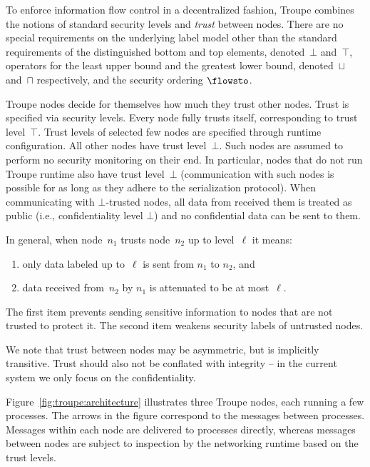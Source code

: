 To  enforce information flow control in a decentralized fashion, Troupe combines the notions of standard security levels and \emph{trust} between nodes.
There are no special requirements on the underlying label model other than the standard requirements of the distinguished bottom and top elements, denoted~$\bot$ and~$\top$, operators for the least upper bound and the greatest lower bound, denoted~$\sqcup$ and~$\sqcap$ respectively, and the security ordering $\flowsto$.

Troupe nodes decide for themselves how much they trust other nodes.
Trust is specified via security levels. Every node fully trusts itself, corresponding to trust level~$\top$. Trust levels of selected few nodes are specified through runtime configuration. All other nodes have trust level~$\bot$. Such nodes are assumed to perform no security monitoring on their end. In particular, nodes that do not run Troupe runtime also have trust level~$\bot$ (communication with such nodes is possible for as long as they adhere to the serialization protocol). When communicating with $\bot$-trusted nodes, all data from received them is treated as public (i.e., confidentiality level $\bot$) and no confidential data can be sent to them. 

In general, when node~$n_1$ trusts node~$n_2$ up to level~$\ell$ it means:
\begin{enumerate}
    \item only data labeled up to~$\ell$ is sent from $n_1$ to $n_2$, and 
    \item data received from~$n_2$ by $n_1$ is attenuated to be at most~$\ell$.
\end{enumerate}

\noindent 
The first item prevents sending sensitive information to nodes that are not trusted to protect it. The second item weakens security labels of untrusted nodes.



 We note that trust between nodes may be asymmetric, but is implicitly transitive. Trust should also not be conflated with integrity -- in the current system we only focus on the confidentiality.

Figure~\ref{fig:troupe:architecture} illustrates three Troupe nodes, each running a few processes. The arrows in the figure correspond to the messages between processes. Messages within each node are delivered to processes directly, whereas messages between nodes are subject to inspection by the networking runtime based on the trust levels. %

